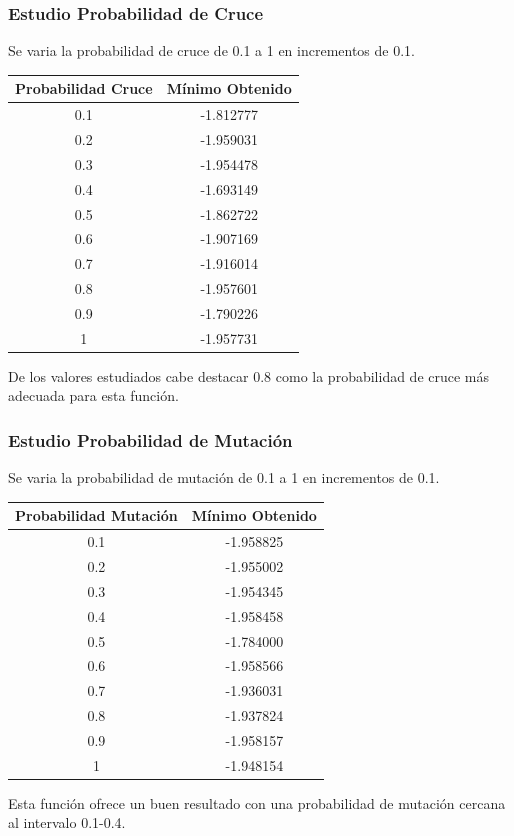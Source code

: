 \documentclass[12pt]{article}
\begin{document}
\subsubsection*{Estudio Probabilidad de Cruce}
	Se varia la probabilidad de cruce de 0.1 a 1 en incrementos de 0.1.
\begin{table}[H]
\begin{center}
\begin{tabular}{|cc|} \hline
Probabilidad Cruce & Mínimo Obtenido \\  \hline
0.1 & -1.812777 \\ 
0.2 & -1.959031 \\ 
0.3 & -1.954478 \\
0.4 & -1.693149 \\
0.5 & -1.862722 \\
0.6 & -1.907169 \\
0.7 & -1.916014 \\
0.8 & -1.957601 \\ 
0.9 & -1.790226 \\
1   & -1.957731 \\  \hline
\end{tabular}
\end{center}
\end{table}
	De los valores estudiados cabe destacar 0.8 como la probabilidad de cruce más adecuada para esta función.

\subsubsection*{Estudio Probabilidad de Mutación}
	Se varia la probabilidad de mutación de 0.1 a 1 en incrementos de 0.1.
\begin{table}[H]
\begin{center}
\begin{tabular}{|cc|} \hline
Probabilidad Mutación & Mínimo Obtenido \\  \hline
0.1 & -1.958825 \\ 
0.2 & -1.955002 \\ 
0.3 & -1.954345 \\
0.4 & -1.958458 \\
0.5 & -1.784000 \\
0.6 & -1.958566 \\
0.7 & -1.936031 \\
0.8 & -1.937824 \\ 
0.9 & -1.958157 \\
1   & -1.948154 \\  \hline
\end{tabular}
\end{center}
\end{table}
	Esta función ofrece un buen resultado con una probabilidad de mutación cercana al intervalo 0.1-0.4.
\end{document}
